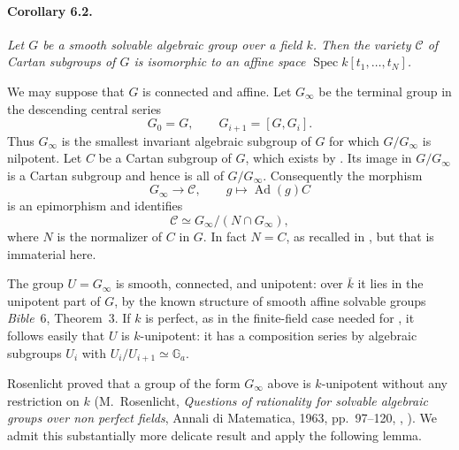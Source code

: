 

\paragraph{\textbf{Corollary 6.2.}}
{\itshape Let \(G\) be a smooth solvable algebraic group over a
field \(k\). Then the variety \(\mathcal C\) of Cartan subgroups
of \(G\) is isomorphic to an affine space
\(\operatorname{Spec}k[t_1,\ldots,t_N]\).}

We may suppose that \(G\) is connected and affine. Let
\(G_\infty\) be the terminal group in the descending central
series
\[
  G_0=G,\qquad G_{i+1}=[G,G_i].
\]
Thus \(G_\infty\) is the smallest invariant algebraic subgroup
of \(G\) for which \(G/G_\infty\) is nilpotent. Let \(C\) be a
Cartan subgroup of \(G\), which exists by . Its image in
\(G/G_\infty\) is a Cartan subgroup and hence is all of
\(G/G_\infty\). Consequently the morphism
\[
  G_\infty\longrightarrow\mathcal C,\qquad
  g\longmapsto\operatorname{Ad}(g)C
\]
is an epimorphism and identifies
\[
  \mathcal C\simeq G_\infty/(N\cap G_\infty),
\]
where \(N\) is the normalizer of \(C\) in \(G\). In fact \(N=C\),
as recalled in , but that is immaterial here.

The group \(U=G_\infty\) is smooth, connected, and unipotent:
over \(\bar k\) it lies in the unipotent part of \(G\), by the
known structure of smooth affine solvable groups
\textup{\emph{Bible}~6, Theorem~3}. If \(k\) is perfect, as in
the finite-field case needed for , it follows easily that
\(U\) is \(k\)-unipotent: it has a composition series by
algebraic subgroups \(U_i\) with
\(U_i/U_{i+1}\simeq\mathbb G_a\).

Rosenlicht proved that a group of the form \(G_\infty\) above is
\(k\)-unipotent without any restriction on \(k\)
\textup{(M.~Rosenlicht, \emph{Questions of rationality for
solvable algebraic groups over non perfect fields}, Annali di
Matematica, 1963, pp.~97--120, , )}. We admit
this substantially more delicate result and apply the following
lemma.

